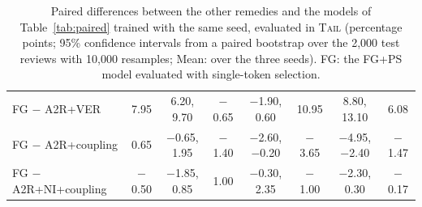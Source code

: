 \documentclass[11pt]{article}
\newcommand{\TAIL}{\textup{\textsc{Tail}}}
\begin{document}
\begin{table}[t]
\begin{tabular}{@{}lccccccc@{}}
FG $-$ A2R+VER & 7.95 & 6.20, 9.70 & $-$0.65 & $-$1.90, 0.60 & 10.95 & 8.80, 13.10 & 6.08 \\
FG $-$ A2R+coupling & 0.65 & $-$0.65, 1.95 & $-$1.40 & $-$2.60, $-$0.20 & $-$3.65 & $-$4.95, $-$2.40 & $-$1.47 \\
FG $-$ A2R+NI+coupling & $-$0.50 & $-$1.85, 0.85 & 1.00 & $-$0.30, 2.35 & $-$1.00 & $-$2.30, 0.30 & $-$0.17 \\
\bottomrule
\end{tabular}
\caption{Paired differences between the other remedies and the models of Table~\ref{tab:paired} trained with the same seed, evaluated in \TAIL{} (percentage points; 95\% confidence intervals from a paired bootstrap over the 2,000 test reviews with 10,000 resamples; Mean: over the three seeds). FG: the FG+PS model evaluated with single-token selection.}
\label{tab:remedies-paired}
\end{table}
\end{document}
